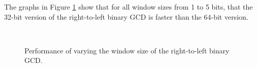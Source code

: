 \documentclass{ucalgthes1}
\theoremstyle{definition}
\begin{document}
The graphs in Figure \ref{fig:stein-32v64} show that for all window sizes from 1 to 5 bits, that the 32-bit version of the right-to-left binary GCD is faster than the 64-bit version.
\begin{figure}[H]
\centering
\mbox{
}
\mbox{
}
\mbox{
}
\caption{Performance of varying the window size of the right-to-left binary GCD.}
\label{fig:stein-32v64}
\end{figure}
\end{document}
